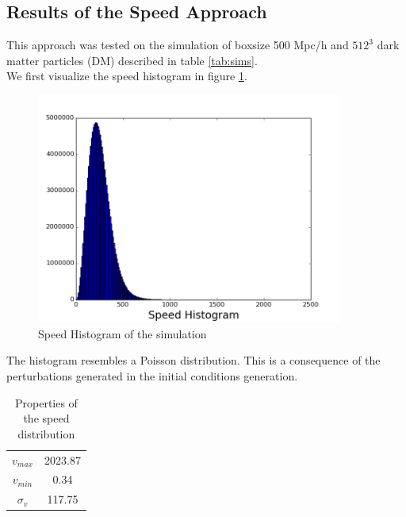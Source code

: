 \documentclass[12pt]{article}
\begin{document}
\subsection{Results of the Speed Approach}
This approach was tested on the simulation of
 boxsize 500 Mpc/h
and $512^{3}$ dark matter particles (DM) described
 in table \ref{tab:sims}. \\

We first visualize the speed histogram in figure
 \ref{fg:hist_vel}.\\

\begin{figure}[ht]
\begin{center}
\includegraphics[width=0.9\textwidth]{graphs/hist_vel.png} %
\caption{Speed Histogram of the simulation}
\label{fg:hist_vel}
\end{center}
\end{figure}
\FloatBarrier

The histogram resembles a Poisson distribution. This is a consequence of the perturbations generated in the initial conditions generation. 

\begin{table}[ht]
    \centering
    \begin{tabular}{|c|c|}
        $v_{max}$ & 2023.87 \\
        $v_{min}$ & 0.34\\
        $\sigma_{v}$ & 117.75 
    \end{tabular}
    \caption{Properties of the speed distribution}
    \label{tab:vel}
\end{table}
\FloatBarrier
\end{document}

